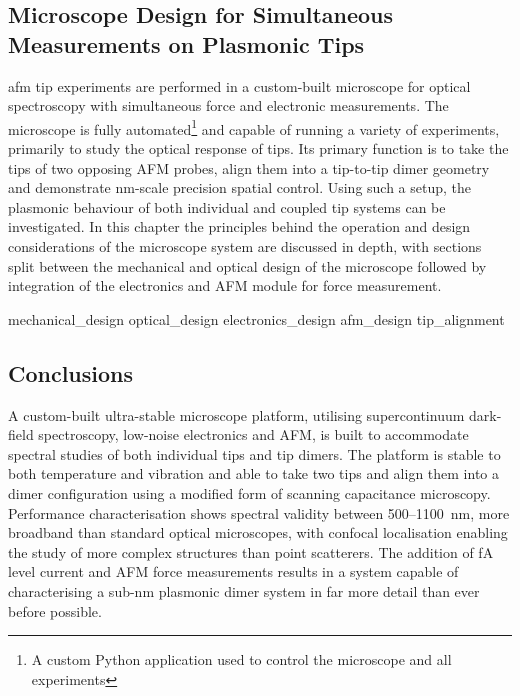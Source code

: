 \documentclass[12pt, a4paper, oneside]{book}
\begin{document}
\begin{singlespace}
{\color{white}
\chapter{Microscope Design for Simultaneous Measurements on Plasmonic Tips}}
\end{singlespace}


\Gls{afm} tip experiments are performed in a custom-built microscope for optical spectroscopy with simultaneous force and electronic measurements. The microscope is fully automated\footnote{A custom Python application used to control the microscope and all experiments} and capable of running a variety of experiments, primarily to study the optical response of tips. Its primary function is to take the tips of two opposing AFM probes, align them into a tip-to-tip dimer geometry and demonstrate nm-scale precision spatial control. Using such a setup, the plasmonic behaviour of both individual and coupled tip systems can be investigated. In this chapter the principles behind the operation and design considerations of the microscope system are discussed in depth, with sections split between the mechanical and optical design of the microscope followed by integration of the electronics and AFM module for force measurement.

{mechanical_design}
{optical_design}
{electronics_design}
{afm_design}
{tip_alignment}

\section{Conclusions}

A custom-built ultra-stable microscope platform, utilising supercontinuum dark-field spectroscopy, low-noise electronics and AFM, is built to accommodate spectral studies of both individual tips and tip dimers. The platform is stable to both temperature and vibration and able to take two tips and align them into a dimer configuration using a modified form of scanning capacitance microscopy. Performance characterisation shows spectral validity between 500--\SI{1100}{nm}, more broadband than standard optical microscopes, with confocal localisation enabling the study of more complex structures than point scatterers. The addition of \si{fA} level current and AFM force measurements results in a system capable of characterising a sub-nm plasmonic dimer system in far more detail than ever before possible.

\ifstandalone
\begin{singlespace}
\printbibliography[notcategory=fullcited]
\end{singlespace}
\fi
\end{document}
